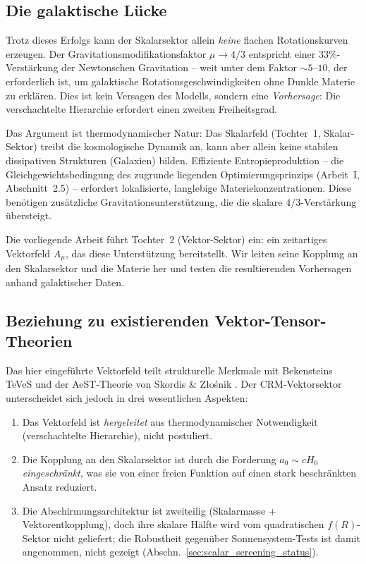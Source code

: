 \documentclass[aps,prd,twocolumn,superscriptaddress,nofootinbib]{revtex4-2}
\begin{document}
\subsection{Die galaktische L\"ucke}

Trotz dieses Erfolgs kann der Skalarsektor allein \textit{keine} flachen Rotationskurven erzeugen. Der Gravitationsmodifikationsfaktor $\mu \to 4/3$ entspricht einer $33\%$-Verst\"arkung der Newtonschen Gravitation -- weit unter dem Faktor $\sim 5$--$10$, der erforderlich ist, um galaktische Rotationsgeschwindigkeiten ohne Dunkle Materie zu erkl\"aren. Dies ist kein Versagen des Modells, sondern eine \textit{Vorhersage}: Die verschachtelte Hierarchie erfordert einen zweiten Freiheitsgrad.

Das Argument ist thermodynamischer Natur: Das Skalarfeld (Tochter~1, Skalar-Sektor) treibt die kosmologische Dynamik an, kann aber allein keine stabilen dissipativen Strukturen (Galaxien) bilden. Effiziente Entropieproduktion -- die Gleichgewichtsbedingung des zugrunde liegenden Optimierungsprinzips (Arbeit~I, Abschnitt~2.5) -- erfordert lokalisierte, langlebige Materiekonzentrationen. Diese ben\"otigen zus\"atzliche Gravitationsunterst\"utzung, die die skalare $4/3$-Verst\"arkung \"ubersteigt.

Die vorliegende Arbeit f\"uhrt Tochter~2 (Vektor-Sektor) ein: ein zeitartiges Vektorfeld $A_\mu$, das diese Unterst\"utzung bereitstellt. Wir leiten seine Kopplung an den Skalarsektor und die Materie her und testen die resultierenden Vorhersagen anhand galaktischer Daten.

\subsection{Beziehung zu existierenden Vektor-Tensor-Theorien}

Das hier eingef\"uhrte Vektorfeld teilt strukturelle Merkmale mit Bekensteins TeVeS \cite{Bekenstein2004} und der AeST-Theorie von Skordis \& Z{\l}o\'snik \cite{Skordis2021}. Der CRM-Vektorsektor unterscheidet sich jedoch in drei wesentlichen Aspekten:
\begin{enumerate}
\item Das Vektorfeld ist \textit{hergeleitet} aus thermodynamischer Notwendigkeit (verschachtelte Hierarchie), nicht postuliert.
\item Die Kopplung an den Skalarsektor ist durch die Forderung $a_0 \sim cH_0$ \textit{eingeschr\"ankt}, was sie von einer freien Funktion auf einen stark beschr\"ankten Ansatz reduziert.
\item Die Abschirmungsarchitektur ist zweiteilig (Skalarmasse + Vektorentkopplung), doch ihre skalare H\"alfte wird vom quadratischen $f(R)$-Sektor nicht geliefert; die Robustheit gegen\"uber Sonnensystem-Tests ist damit angenommen, nicht gezeigt (Abschn.~\ref{sec:scalar_screening_status}).
\end{enumerate}
\end{document}
